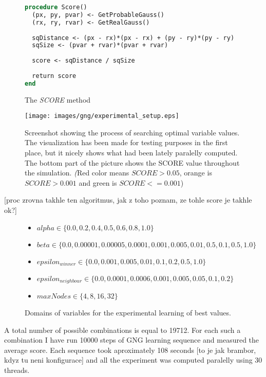\begin{figure}
\begin{lstlisting}[language=Pascal]
procedure Score()
  (px, py, pvar) <- GetProbableGauss()
  (rx, ry, rvar) <- GetRealGauss()
  
  sqDistance <- (px - rx)*(px - rx) + (py - ry)*(py - ry)
  sqSize <- (pvar + rvar)*(pvar + rvar)
  
  score <- sqDistance / sqSize
  
  return score
end
\end{lstlisting}       
\caption{The \emph{SCORE} method}
\label{usedalgo:scoremethod}
\end{figure}
       
\begin{figure}      
\begin{center}
\texttt{[image: images/gng/experimental\_setup.eps]}    
\caption{Screenshot showing the process of searching optimal variable values. The visualization has been made for testing purposes in the first place, but it nicely shows what had been lately paralelly computed. The bottom part of the picture shows the SCORE value throughout the simulation. {\emph (Red color means $SCORE > 0.05$, orange is $SCORE > 0.001$ and green is $SCORE <= 0.001$)} }
\end{center}                          
\label{usedalgo:gngexperimentscreen}
\end{figure}
[proc zrovna takhle ten algoritmus, jak z toho poznam, ze tohle score je takhle ok?]
\begin{figure}          
\begin{itemize}
\item $alpha \in \{0.0, 0.2, 0.4, 0.5, 0.6, 0.8, 1.0\}$
\item $beta \in \{0.0, 0.00001, 0.00005, 0.0001, 0.001, 0.005, 0.01, 0.5, 0.1, 0.5, 1.0\}$
\item $epsilon_{winner} \in \{0.0, 0.001, 0.005, 0.01, 0.1, 0.2, 0.5, 1.0\}$
\item $epsilon_{neighbour} \in \{0.0, 0.0001, 0.0006, 0.001, 0.005, 0.05, 0.1, 0.2\}$
\item $maxNodes \in \{4, 8, 16, 32\}$
\end{itemize}
\caption{Domains of variables for the experimental learning of best values.}
\label{usedalgo:gngexperimentdomains}
\end{figure}

A total number of possible combinations is equal to 19712. For each such a combination I have run 10000 steps of GNG learning sequence and measured the average score. Each sequence took aproximately 108 seconds [to je jak brambor, kdyz tu neni konfigurace] and all the experiment was computed paralelly using 30 threads.

